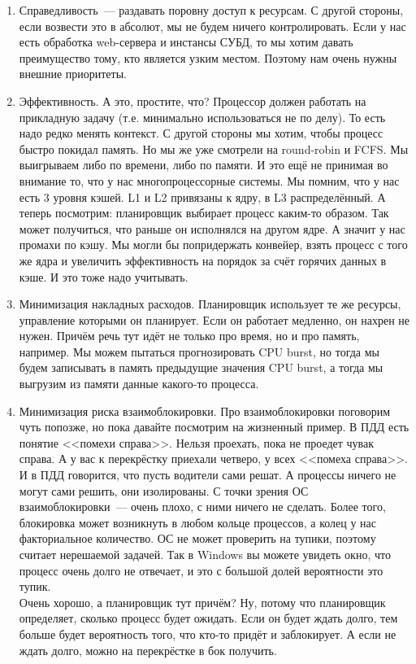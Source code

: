 \documentclass{article}
\begin{document}
    \begin{enumerate}
        \item Справедливость~--- раздавать поровну доступ к ресурсам. С другой стороны, если возвести это в абсолют, мы не будем ничего контролировать. Если у нас есть обработка web-сервера и инстансы СУБД, то мы хотим давать преимущество тому, кто является узким местом. Поэтому нам очень нужны внешние приоритеты.
        \item Эффективность. А это, простите, что? Процессор должен работать на прикладную задачу (т.е. минимально использоваться не по делу). То есть надо редко менять контекст. С другой стороны мы хотим, чтобы процесс быстро покидал память. Но мы же уже смотрели на round-robin и FCFS. Мы выигрываем либо по времени, либо по памяти. И это ещё не принимая во внимание то, что у нас многопроцессорные системы. Мы помним, что у нас есть 3 уровня кэшей. L1 и L2 привязаны к ядру, в L3 распределённый. А теперь посмотрим: планировщик выбирает процесс каким-то образом. Так может получиться, что раньше он исполнялся на другом ядре. А значит у нас промахи по кэшу. Мы могли бы попридержать конвейер, взять процесс с того же ядра и увеличить эффективность на порядок за счёт горячих данных в кэше. И это тоже надо учитывать.
        \item Минимизация накладных расходов. Планировщик использует те же ресурсы, управление которыми он планирует. Если он работает медленно, он нахрен не нужен. Причём речь тут идёт не только про время, но и про память, например. Мы можем пытаться прогнозировать CPU burst, но тогда мы будем записывать в память предыдущие значения CPU burst, а тогда мы выгрузим из памяти данные какого-то процесса.
        \item Минимизация риска взаимоблокировки. Про взаимоблокировки поговорим чуть попозже, но пока давайте посмотрим на жизненный пример. В ПДД есть понятие <<помехи справа>>. Нельзя проехать, пока не проедет чувак справа. А у вас к перекрёстку приехали четверо, у всех <<помеха справа>>. И в ПДД говорится, что пусть водители сами решат. А процессы ничего не могут сами решить, они изолированы. С точки зрения ОС взаимоблокировки~--- очень плохо, с ними ничего не сделать. Более того, блокировка может возникнуть в любом кольце процессов, а колец у нас факториальное количество. ОС не может проверить на тупики, поэтому считает нерешаемой задачей. Так в Windows вы можете увидеть окно, что процесс очень долго не отвечает, и это с большой долей вероятности это тупик.\\
        Очень хорошо, а планировщик тут причём? Ну, потому что планировщик определяет, сколько процесс будет ожидать. Если он будет ждать долго, тем больше будет вероятность того, что кто-то придёт и заблокирует. А если не ждать долго, можно на перекрёстке в бок получить.\\

\end{enumerate}
\end{document}
